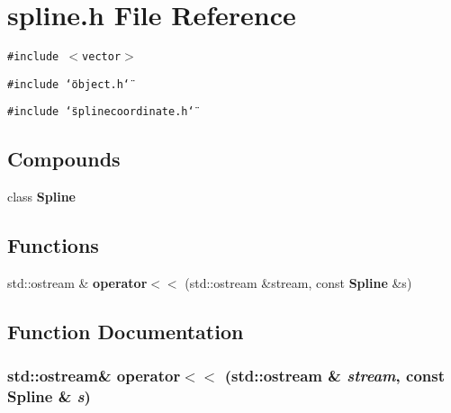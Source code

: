 \section{spline.h File Reference}
\label{spline_8h}
{\tt \#include $<$vector$>$}\par
{\tt \#include \char`\"{}object.h\char`\"{}}\par
{\tt \#include \char`\"{}splinecoordinate.h\char`\"{}}\par
\subsection*{Compounds}
\begin{CompactItemize}
\item 
class {\bf Spline}
\end{CompactItemize}
\subsection*{Functions}
\begin{CompactItemize}
\item 
std::ostream \& {\bf operator$<$$<$} (std::ostream \&stream, const {\bf Spline} \&s)
\end{CompactItemize}


\subsection{Function Documentation}
\subsubsection{\setlength{\rightskip}{0pt plus 5cm}std::ostream\& operator$<$$<$ (std::ostream \& {\em stream}, const {\bf Spline} \& {\em s})\hspace{0.3cm}{\tt  [inline]}}\label{spline_8h_a0}


